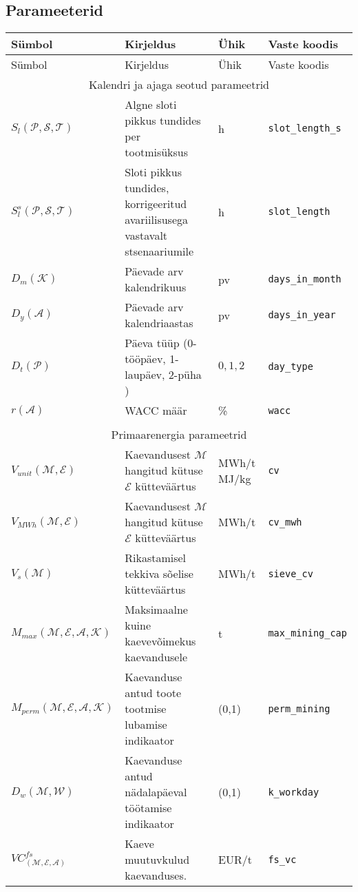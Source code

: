 \begin{landscape}
\section{Parameeterid}
\label{app:parameetrid}

\begin{longtable}{l l l l}
Sümbol & Kirjeldus & Ühik & Vaste koodis\\
\hline
\endfirsthead

Sümbol & Kirjeldus & Ühik & Vaste koodis\\
\hline
\endhead

\multicolumn{4}{c}{Kalendri ja ajaga seotud parameetrid} \\
$S_l(\mathcal{P}, \mathcal{S},\mathcal{T})$     & Algne sloti pikkus tundides per tootmisüksus & h & \texttt{slot\_length\_s} \\
$S^s_l(\mathcal{P}, \mathcal{S}, \mathcal{T})$  & Sloti pikkus tundides, korrigeeritud avariilisusega vastavalt stsenaariumile & h & \texttt{slot\_length} \\
$D_m(\mathcal{K})$ & Päevade arv kalendrikuus   & pv & \texttt{days\_in\_month} \\
$D_y(\mathcal{A})$ & Päevade arv kalendriaastas & pv & \texttt{days\_in\_year} \\
$D_t(\mathcal{P})$ & Päeva tüüp (0-tööpäev, 1-laupäev, 2-püha )& ${0,1,2}$ & \texttt{day\_type} \\
$r(\mathcal{A})$ & WACC määr & \% & \texttt{wacc} \\

\\ \multicolumn{4}{c}{Primaarenergia parameetrid} \\
$\mathit{V}_{unit}(\mathcal{M}, \mathcal{E})$ & Kaevandusest $\mathcal{M}$ hangitud kütuse $\mathcal{E}$ kütteväärtus  & MWh/t MJ/kg& \texttt{cv}\\
$\mathit{V}_{MWh}(\mathcal{M}, \mathcal{E}) $ & Kaevandusest $\mathcal{M}$ hangitud kütuse $\mathcal{E}$ kütteväärtus  & MWh/t      & \texttt{cv\_mwh}\\
$\mathit{V}_s(\mathcal{M})$                   & Rikastamisel tekkiva sõelise kütteväärtus                              & MWh/t      & \texttt{sieve\_cv} \\ 

$\mathit{M}_{max}(\mathcal{M}, \mathcal{E},\mathcal{A}, \mathcal{K})$ & Maksimaalne kuine kaevevõimekus kaevandusele & t & \texttt{max\_mining\_cap} \\
$\mathit{M}_{perm}(\mathcal{M}, \mathcal{E},\mathcal{A}, \mathcal{K})$& Kaevanduse antud toote tootmise lubamise indikaator &(0,1)& \texttt{perm\_mining} \\
$\mathit{D}_w(\mathcal{M}, \mathcal{W})$ & Kaevanduse antud nädalapäeval töötamise indikaator &(0,1)& \texttt{k\_workday} \\
$\mathit{VC}^{fs}_(\mathcal{M}, \mathcal{E}, \mathcal{A})$ & Kaeve muutuvkulud kaevanduses. & EUR/t & \texttt{fs\_vc} \\


\end{longtable}
\end{landscape}
